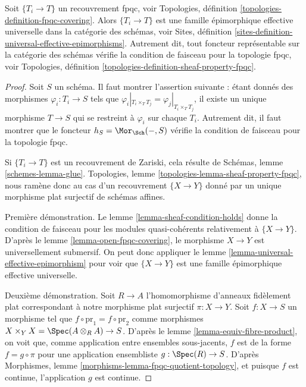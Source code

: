 \begin{lemma}
\label{lemma-fpqc-universal-effective-epimorphisms}
Soit $\{T_i \to T\}$ un recouvrement fpqc, voir Topologies, définition
\ref{topologies-definition-fpqc-covering}.
Alors $\{T_i \to T\}$ est une famille épimorphique effective universelle dans la catégorie
des schémas, voir Sites, définition
\ref{sites-definition-universal-effective-epimorphisms}.
Autrement dit, tout foncteur représentable sur la catégorie des schémas
vérifie la condition de faisceau pour la topologie fpqc, voir Topologies,
définition \ref{topologies-definition-sheaf-property-fpqc}.
\end{lemma}

\begin{proof}
Soit $S$ un schéma. Il faut montrer l'assertion suivante : étant donnés des
morphismes $\varphi_i : T_i \to S$ tels que
$\varphi_i|_{T_i \times_T T_j} = \varphi_j|_{T_i \times_T T_j}$, il existe un
unique morphisme $T \to S$ qui se restreint à $\varphi_i$ sur chaque $T_i$.
Autrement dit, il faut montrer que le foncteur
$h_S = \Mor_{\Sch}( - , S)$ vérifie la condition de faisceau pour la topologie
fpqc.

\medskip\noindent
Si $\{T_i \to T\}$ est un recouvrement de Zariski, cela résulte de Schémas,
lemme \ref{schemes-lemma-glue}. Topologies, lemme
\ref{topologies-lemma-sheaf-property-fpqc}, nous ramène donc au cas d'un
recouvrement $\{X \to Y\}$ donné par un unique morphisme plat surjectif de
schémas affines.

\medskip\noindent
Première démonstration. Le lemme \ref{lemma-sheaf-condition-holds} donne la
condition de faisceau pour les modules quasi-cohérents relativement à
$\{X \to Y\}$. D'après le lemme \ref{lemma-open-fpqc-covering}, le morphisme
$X \to Y$ est universellement submersif. On peut donc appliquer le lemme
\ref{lemma-universal-effective-epimorphism} pour voir que $\{X \to Y\}$ est une
famille épimorphique effective universelle.

\medskip\noindent
Deuxième démonstration. Soit $R \to A$ l'homomorphisme d'anneaux fidèlement
plat correspondant à notre morphisme plat surjectif $\pi : X \to Y$.
Soit $f : X \to S$ un morphisme tel que
$f \circ \text{pr}_1 = f \circ \text{pr}_2$ comme morphismes
$X \times_Y X = \Spec(A \otimes_R A) \to S$.
D'après le lemme \ref{lemma-equiv-fibre-product}, on voit que, comme
application entre ensembles sous-jacents, $f$ est de la forme
$f = g \circ \pi$ pour une application ensembliste
$g : \Spec(R) \to S$. D'après Morphismes, lemme
\ref{morphisms-lemma-fpqc-quotient-topology}, et puisque $f$ est continue,
l'application $g$ est continue.


\end{proof}
